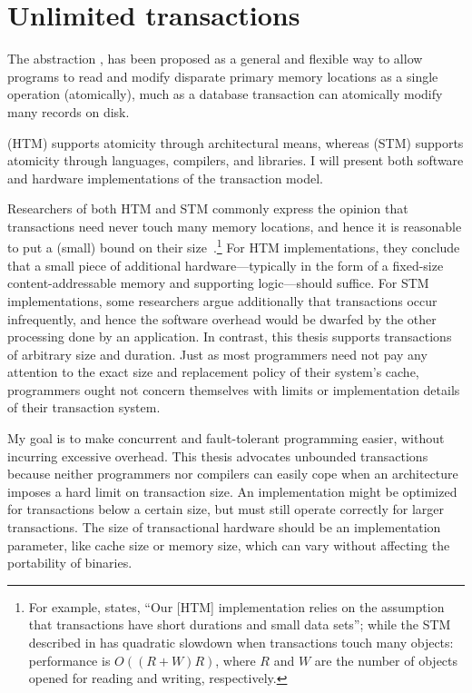 \section{Unlimited transactions}

The
 abstraction
\cite{Knight86,HerlihyMo93,StoneStHe93,RajwarGo02,ShavitTo95,HerlihyLuMoSc03},
has
been proposed as a general and flexible way to allow programs to read
and modify disparate primary memory locations as a single
operation (atomically), much as a database transaction can atomically modify many
records on disk.

 (HTM) supports atomicity through
architectural means, whereas 
(STM) supports atomicity through languages, compilers, and libraries.
I will present both software and hardware implementations of the
transaction model.

Researchers of both HTM and STM commonly express the opinion that
transactions need never touch many memory locations, and hence it is
reasonable to put a (small) bound on their
size~\cite{HerlihyMo93,HerlihyLuMoSc03}.\footnote{%
For example, \cite[section 5.2]{HerlihyMo93} states,
``Our [HTM] implementation relies on the assumption that transactions have
short durations and small data sets''; while 
the STM described in \cite{HerlihyLuMoSc03} has quadratic slowdown when
transactions touch many objects: performance is $O((R+W)R)$, where $R$
and $W$ are the number of objects opened for reading and writing,
respectively.}
For HTM implementations,
they conclude that a small piece of additional hardware---typically in
the form of a fixed-size content-addressable memory and supporting
logic---should suffice.  For STM implementations, some researchers
argue additionally that transactions occur infrequently, and hence the
software overhead would be dwarfed by the other processing done by an
application.
In contrast, this thesis supports transactions of
arbitrary size and duration.  Just as most programmers need not pay any
attention to the exact size and replacement policy of their
system's cache, programmers ought not concern themselves with limits
or implementation details of their transaction system.

My goal is to
make concurrent and fault-tolerant programming easier,
without incurring excessive overhead.  This thesis advocates
unbounded transactions because neither programmers nor compilers can
easily cope when an architecture imposes a hard limit on transaction
size.  An implementation might be optimized for transactions below a
certain size, but must still operate correctly for larger
transactions.  The size of transactional hardware should be an
implementation parameter, like cache size or memory size, which can
vary without affecting the portability of binaries.

